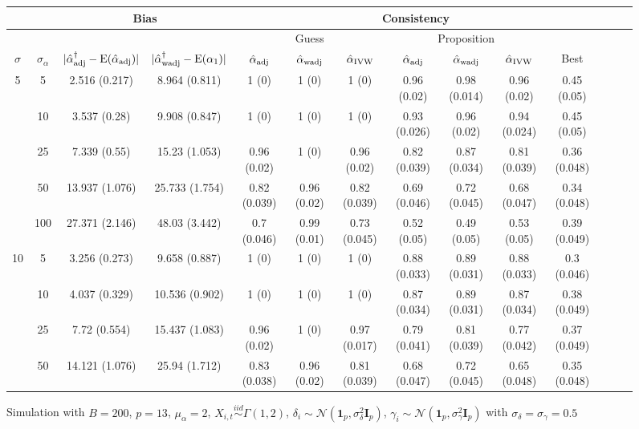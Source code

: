 \documentclass[10pt]{article}
\newcommand{\simiid}{\stackrel{iid}{\sim}} %
\def\normal#1#2{\mathcal{N}(#1,#2)} %
\def\E#1{\mathrm{E}(#1)} %
\theoremstyle{definition}
\begin{document}
\begin{sidewaysfigure}
\centering
\caption{Simulation  with $B = 200$, $p = 13$, $\mu_{\alpha}=2$, $X_{i,t} \simiid \Gamma(1,2)$, $\delta_i \sim \normal{\mathbf{1}_p}{\sigma^2_{\delta}\mathbf{I}_p}$, $\gamma_i \sim \normal{\mathbf{1}_p}{\sigma^2_{\gamma}\mathbf{I}_p}$ with $\sigma_{\delta}=\sigma_{\gamma}=0.5$}
\begin{tabular}{cc|cc|ccc|ccc|ccc|c}
  & & \multicolumn{2}{c|}{Bias}  & \multicolumn{7}{c}{Consistency}  \\ 
  \hline 
   &  & & & \multicolumn{3}{|c|}{Guess} & \multicolumn{3}{|c|}{Proposition} & \\ 
 $\sigma$   & $\sigma_{\alpha}$ & $|\hat{\alpha}_{\rm adj}^{\dagger}-\E{\hat{\alpha}_{\rm adj}}|$ & $|\hat{\alpha}_{\rm wadj}^{\dagger}-\E{\alpha_1}|$ & $\hat{\alpha}_{\rm adj}$  & $\hat{\alpha}_{\rm wadj}$ & $\hat{\alpha}_{\rm IVW}$ & $\hat{\alpha}_{\rm adj}$  & $\hat{\alpha}_{\rm wadj}$ & $\hat{\alpha}_{\rm IVW}$ &  Best \\[.3cm]  
  \hline
 \multirow{5}{*}{5}  & 5  & 2.516 (0.217) & 8.964 (0.811) & 1 (0) & 1 (0) & 1 (0) & 0.96 (0.02) & 0.98 (0.014) & 0.96 (0.02) & 0.45 (0.05) \\ 
    & 10  & 3.537 (0.28) & 9.908 (0.847) & 1 (0) & 1 (0) & 1 (0) & 0.93 (0.026) & 0.96 (0.02) & 0.94 (0.024) & 0.45 (0.05) \\ 
   & 25  & 7.339 (0.55) & 15.23 (1.053) & 0.96 (0.02) & 1 (0) & 0.96 (0.02) & 0.82 (0.039) & 0.87 (0.034) & 0.81 (0.039) & 0.36 (0.048) \\ 
    & 50  & 13.937 (1.076) & 25.733 (1.754) & 0.82 (0.039) & 0.96 (0.02) & 0.82 (0.039) & 0.69 (0.046) & 0.72 (0.045) & 0.68 (0.047) & 0.34 (0.048) \\ 
   & 100  & 27.371 (2.146) & 48.03 (3.442) & 0.7 (0.046) & 0.99 (0.01) & 0.73 (0.045) & 0.52 (0.05) & 0.49 (0.05) & 0.53 (0.05) & 0.39 (0.049) \\[.3cm] 
   \multirow{5}{*}{10}  & 5  & 3.256 (0.273) & 9.658 (0.887) & 1 (0) & 1 (0) & 1 (0) & 0.88 (0.033) & 0.89 (0.031) & 0.88 (0.033) & 0.3 (0.046) \\ 
    & 10  & 4.037 (0.329) & 10.536 (0.902) & 1 (0) & 1 (0) & 1 (0) & 0.87 (0.034) & 0.89 (0.031) & 0.87 (0.034) & 0.38 (0.049) \\ 
   & 25  & 7.72 (0.554) & 15.437 (1.083) & 0.96 (0.02) & 1 (0) & 0.97 (0.017) & 0.79 (0.041) & 0.81 (0.039) & 0.77 (0.042) & 0.37 (0.049) \\ 
    & 50  & 14.121 (1.076) & 25.94 (1.712) & 0.83 (0.038) & 0.96 (0.02) & 0.81 (0.039) & 0.68 (0.047) & 0.72 (0.045) & 0.65 (0.048) & 0.35 (0.048) \\ 

\end{tabular}
\end{sidewaysfigure}
\end{document}
